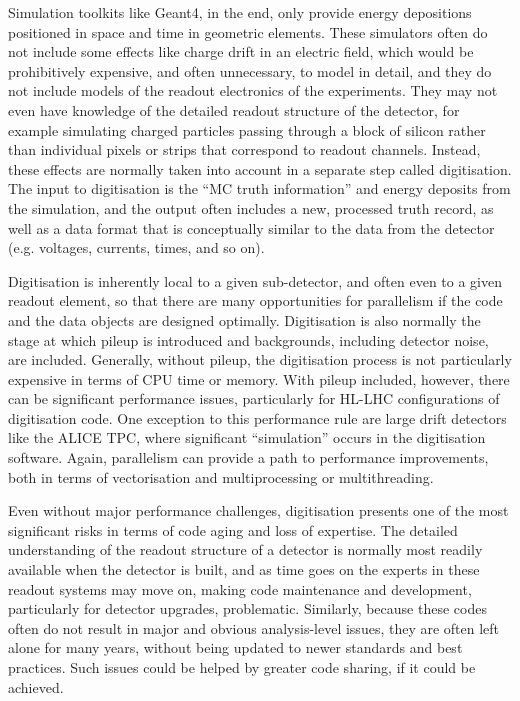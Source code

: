 \documentclass[12pt,a4paper]{article}
\begin{document}
Simulation toolkits like Geant4, in the end, only provide energy
depositions positioned in space and time in geometric elements. These
simulators often do not include some effects like charge drift in an
electric field, which would be prohibitively expensive, and often
unnecessary, to model in detail, and they do not include models of the
readout electronics of the experiments. They may not even have knowledge
of the detailed readout structure of the detector, for example
simulating charged particles passing through a block of silicon rather
than individual pixels or strips that correspond to readout channels.
Instead, these effects are normally taken into account in a separate
step called digitisation. The input to digitisation is the ``MC truth
information'' and energy deposits from the simulation, and the output
often includes a new, processed truth record, as well as a data format
that is conceptually similar to the data from the detector (e.g.
voltages, currents, times, and so on).

Digitisation is inherently local to a given sub-detector, and often even
to a given readout element, so that there are many opportunities for
parallelism if the code and the data objects are designed optimally.
Digitisation is also normally the stage at which pileup is introduced
and backgrounds, including detector noise, are included. Generally,
without pileup, the digitisation process is not particularly expensive
in terms of CPU time or memory. With pileup included, however, there can
be significant performance issues, particularly for HL-LHC
configurations of digitisation code. One exception to this performance
rule are large drift detectors like the ALICE TPC, where significant
``simulation'' occurs in the digitisation software. Again, parallelism
can provide a path to performance improvements, both in terms of
vectorisation and multiprocessing or multithreading.

Even without major performance challenges, digitisation presents one of
the most significant risks in terms of code aging and loss of expertise.
The detailed understanding of the readout structure of a detector is
normally most readily available when the detector is built, and as time
goes on the experts in these readout systems may move on, making code
maintenance and development, particularly for detector upgrades,
problematic. Similarly, because these codes often do not result in major
and obvious analysis-level issues, they are often left alone for many
years, without being updated to newer standards and best practices. Such
issues could be helped by greater code sharing, if it could be achieved.
\end{document}
